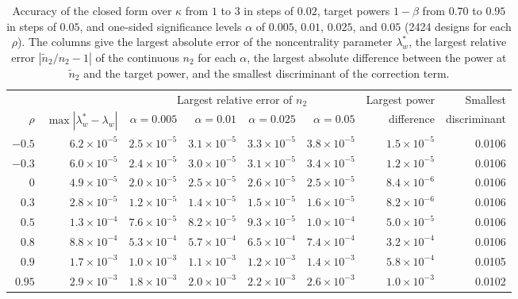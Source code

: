 \begin{table}[ht]
\centering
\footnotesize
\setlength{\tabcolsep}{4pt}
\caption{Accuracy of the closed form over $\kappa$ from $1$ to $3$ in steps of $0.02$, target powers $1 - \beta$ from $0.70$ to $0.95$ in steps of $0.05$, and one-sided significance levels $\alpha$ of $0.005$, $0.01$, $0.025$, and $0.05$ (2424 designs for each $\rho$). The columns give the largest absolute error of the noncentrality parameter $\lambda_w^{*}$, the largest relative error $|\tilde n_2 / n_2 - 1|$ of the continuous $n_2$ for each $\alpha$, the largest absolute difference between the power at $\tilde n_2$ and the target power, and the smallest discriminant of the correction term.}
\label{tab:accuracy_grid}
\begin{threeparttable}
\begin{tabular}{rrrrrrrr}
\hline
 & & \multicolumn{4}{c}{Largest relative error of $n_2$} & Largest power & Smallest \\
\cline{3-6}
$\rho$ & $\max|\lambda_w^{*} - \lambda_w|$ & $\alpha = 0.005$ & $\alpha = 0.01$ & $\alpha = 0.025$ & $\alpha = 0.05$ & difference & discriminant \\
\hline
$-0.5$ & $6.2 \times 10^{-5}$ & $2.5 \times 10^{-5}$ & $3.1 \times 10^{-5}$ & $3.3 \times 10^{-5}$ & $3.8 \times 10^{-5}$ & $1.5 \times 10^{-5}$ & 0.0106 \\
$-0.3$ & $6.0 \times 10^{-5}$ & $2.4 \times 10^{-5}$ & $3.0 \times 10^{-5}$ & $3.1 \times 10^{-5}$ & $3.4 \times 10^{-5}$ & $1.2 \times 10^{-5}$ & 0.0106 \\
$0$ & $4.9 \times 10^{-5}$ & $2.0 \times 10^{-5}$ & $2.5 \times 10^{-5}$ & $2.6 \times 10^{-5}$ & $2.5 \times 10^{-5}$ & $8.4 \times 10^{-6}$ & 0.0106 \\
$0.3$ & $2.8 \times 10^{-5}$ & $1.2 \times 10^{-5}$ & $1.4 \times 10^{-5}$ & $1.5 \times 10^{-5}$ & $1.6 \times 10^{-5}$ & $8.2 \times 10^{-6}$ & 0.0106 \\
$0.5$ & $1.3 \times 10^{-4}$ & $7.6 \times 10^{-5}$ & $8.2 \times 10^{-5}$ & $9.3 \times 10^{-5}$ & $1.0 \times 10^{-4}$ & $5.0 \times 10^{-5}$ & 0.0106 \\
$0.8$ & $8.8 \times 10^{-4}$ & $5.3 \times 10^{-4}$ & $5.7 \times 10^{-4}$ & $6.5 \times 10^{-4}$ & $7.4 \times 10^{-4}$ & $3.2 \times 10^{-4}$ & 0.0106 \\
$0.9$ & $1.7 \times 10^{-3}$ & $1.0 \times 10^{-3}$ & $1.1 \times 10^{-3}$ & $1.2 \times 10^{-3}$ & $1.4 \times 10^{-3}$ & $5.8 \times 10^{-4}$ & 0.0105 \\
$0.95$ & $2.9 \times 10^{-3}$ & $1.8 \times 10^{-3}$ & $2.0 \times 10^{-3}$ & $2.2 \times 10^{-3}$ & $2.6 \times 10^{-3}$ & $1.0 \times 10^{-3}$ & 0.0102 \\

\end{tabular}
\end{threeparttable}
\end{table}
